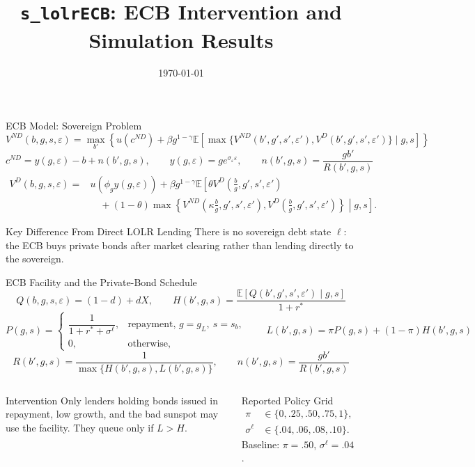 \documentclass[aspectratio=169]{beamer}
\title{\texttt{s\_lolrECB}: ECB Intervention and Simulation Results}
\author{}
\date{\today}
\begin{document}
\begin{frame}
    \titlepage
\end{frame}

\begin{frame}{ECB Model: Sovereign Problem}
\footnotesize
\[
V^{ND}(b,g,s,\varepsilon)=
\max_{b'}
\left\{
u(c^{ND})+\beta g^{1-\gamma}
\mathbb{E}\!\left[
\max\{V^{ND}(b',g',s',\varepsilon'),V^D(b',g',s',\varepsilon')\}
\mid g,s\right]
\right\}
\]
\[
c^{ND}=y(g,\varepsilon)-b+n(b',g,s),
\qquad
y(g,\varepsilon)=g e^{\sigma_\varepsilon\varepsilon},
\qquad
n(b',g,s)=\frac{g b'}{R(b',g,s)}
\]
\[
\begin{aligned}
V^D(b,g,s,\varepsilon)
={}&u\!\left(\phi_g y(g,\varepsilon)\right)+\beta g^{1-\gamma}
\mathbb{E}\!\left[
\theta V^D\!\left(\frac{b}{g},g',s',\varepsilon'\right)\right.\\[-1mm]
&\left.\quad +(1-\theta)
\max\!\left\{
V^{ND}\!\left(\kappa\frac{b}{g},g',s',\varepsilon'\right),
V^D\!\left(\frac{b}{g},g',s',\varepsilon'\right)
\right\}
\middle| g,s
\right].
\end{aligned}
\]

\medskip
\begin{block}{Key Difference From Direct LOLR Lending}
There is no sovereign debt state $\ell$: the ECB buys private bonds after market clearing rather
than lending directly to the sovereign.
\end{block}
\end{frame}

\begin{frame}{ECB Facility and the Private-Bond Schedule}
\small
\[
Q(b,g,s,\varepsilon)=(1-d)+dX,
\qquad
H(b',g,s)=\frac{\mathbb{E}[Q(b',g',s',\varepsilon')\mid g,s]}{1+r^\ast}
\]
\[
P(g,s)=
\begin{cases}
\dfrac{1}{1+r^\ast+\sigma^\ell}, & \text{repayment, }g=g_L,\ s=s_b,\\[5pt]
0, & \text{otherwise,}
\end{cases}
\qquad
L(b',g,s)=\pi P(g,s)+(1-\pi)H(b',g,s)
\]
\[
R(b',g,s)=\frac{1}{\max\{H(b',g,s),L(b',g,s)\}},
\qquad
n(b',g,s)=\frac{g b'}{R(b',g,s)}
\]

\begin{columns}[T,onlytextwidth]
\begin{block}{Intervention}
Only lenders holding bonds issued in repayment, low growth, and the bad sunspot
may use the facility. They queue only if $L>H$.
\end{block}
\begin{block}{Reported Policy Grid}
\[
\begin{aligned}
\pi&\in\{0,.25,.50,.75,1\},\\
\sigma^\ell&\in\{.04,.06,.08,.10\}.
\end{aligned}
\]
Baseline: $\pi=.50$, $\sigma^\ell=.04$.
\end{block}
\end{columns}
\end{frame}
\end{document}
